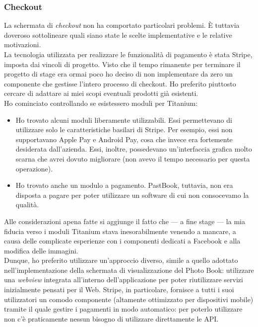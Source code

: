			\subsubsection{Checkout}
				La schermata di \emph{checkout} non ha comportato particolari problemi. È tuttavia doveroso sottolineare quali siano
				state le scelte implementative e le relative motivazioni.\\
				La tecnologia utilizzata per realizzare le funzionalità di pagamento è stata Stripe, imposta dai vincoli di progetto.
				Visto che il tempo rimanente per terminare il progetto di stage era ormai poco ho deciso di non implementare
				da zero un componente che gestisse l'intero processo di checkout. Ho preferito piuttosto cercare di adattare ai miei
				scopi eventuali prodotti già esistenti.\\
				Ho cominciato controllando se esistessero moduli per Titanium:
				\begin{itemize}
					\item Ho trovato alcuni moduli liberamente utilizzabili. Essi permettevano di utilizzare solo le
					caratteristiche basilari di Stripe. Per esempio, essi non supportavano Apple Pay e Android Pay, cosa che
					invece era fortemente desiderata dall'azienda. Essi, inoltre, possedevano un'interfaccia grafica molto
					scarna che avrei dovuto migliorare (non avevo il tempo necessario per questa operazione).
					\item Ho trovato anche un modulo a pagamento. PastBook, tuttavia, non era disposta a pagare per poter
					utilizzare un software di cui non consocevamo la qualità.
				\end{itemize}
				Alle considerazioni apena fatte si aggiunge il fatto che — a fine stage — la mia fiducia verso i moduli Titanium
				stava inesorabilmente venendo a mancare, a causa delle complicate esperienze con i componenti dedicati a Facebook e
				alla modifica delle immagini.\\
				Dunque, ho preferito utilizzare un'approccio diverso, simile a quello adottato nell'implementazione della schermata
				di visualizzazione del Photo Book: utilizzare una \emph{webview} integrata all'interno dell'applicazione per poter
				riutilizzare servizi inizialmente pensati per il Web. Stripe, in particolare, fornisce a tutti i suoi
				utilizzatori un comodo componente (altamente ottimizzato per dispositivi mobile) tramite il quale gestire i pagamenti
				in modo automatico: per poterlo utilizzare non c'è praticamente nessun bisogno di utilizzare direttamente le API.
